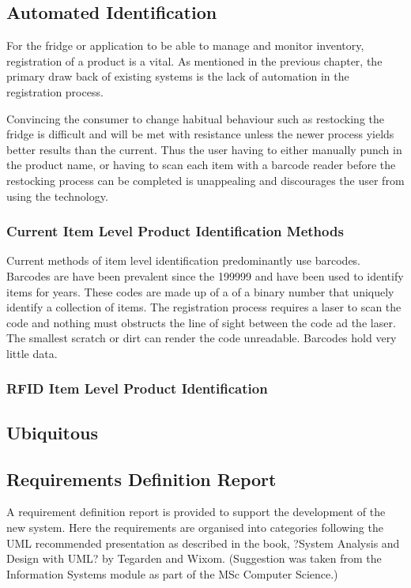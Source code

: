 \documentclass[a4paper, 11pt]{article}
\begin{document}
\subsection{Automated Identification}
For the fridge or application to be able to manage and monitor inventory, registration of a product is a vital. As mentioned in the previous chapter, the primary draw back of existing systems is the lack of automation in the registration process.

Convincing the consumer to change habitual behaviour such as restocking the fridge is difficult and will be met with resistance unless the newer process yields better results than the current. Thus the user having to either manually punch in the product name, or having to scan each item with a barcode reader before the restocking process can be completed is unappealing and discourages the user from using the technology. 

\subsubsection{Current Item Level Product Identification Methods} 
Current methods of item level identification predominantly use barcodes. Barcodes are have been prevalent since the 199999 and have been used to identify items for years. These codes are made up of a of a binary number that uniquely identify a collection of items. The registration process requires a laser to scan the code and nothing must obstructs the line of sight between the code ad the laser. The smallest scratch or dirt can render the code unreadable.  Barcodes hold very little data. 

\subsubsection{RFID Item Level Product Identification}


\subsection{Ubiquitous}

\subsection{Requirements Definition Report}
A requirement definition report is provided to support the development of the new system. Here the requirements are organised into categories following the UML recommended presentation as described in the book, ?System Analysis and Design with UML? by Tegarden and Wixom. (Suggestion was taken from the Information Systems module as part of the MSc Computer Science.)
\end{document}

